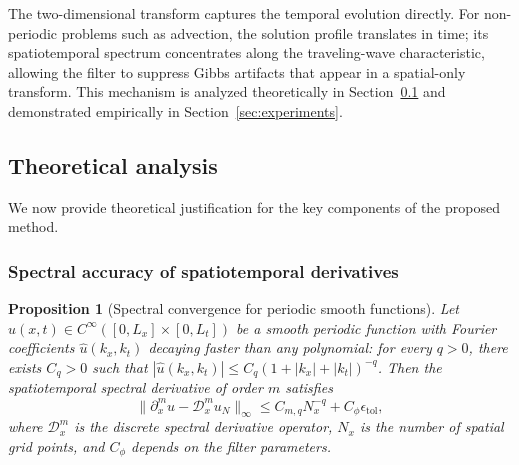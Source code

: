 \documentclass[preprint,12pt]{elsarticle}
\newtheorem{proposition}{Proposition}
\begin{document}
The two-dimensional transform captures the temporal evolution directly. For non-periodic problems such as advection, the solution profile translates in time; its spatiotemporal spectrum concentrates along the traveling-wave characteristic, allowing the filter to suppress Gibbs artifacts that appear in a spatial-only transform. This mechanism is analyzed theoretically in Section~\ref{sec:theory} and demonstrated empirically in Section~\ref{sec:experiments}.

\subsection{Theoretical analysis}
\label{sec:theory}

We now provide theoretical justification for the key components of the proposed method.

\subsubsection{Spectral accuracy of spatiotemporal derivatives}

\begin{proposition}[Spectral convergence for periodic smooth functions]
\label{prop:spectral}
Let $u(x,t) \in C^\infty([0,L_x]\times[0,L_t])$ be a smooth periodic function with Fourier coefficients $\hat{u}(k_x,k_t)$ decaying faster than any polynomial: for every $q>0$, there exists $C_q>0$ such that $|\hat{u}(k_x,k_t)| \le C_q (1+|k_x|+|k_t|)^{-q}$. Then the spatiotemporal spectral derivative of order $m$ satisfies
\begin{equation}
\|\partial_x^m u - \mathcal{D}_x^m u_N\|_\infty \le C_{m,q} N_x^{-q} + C_\phi \epsilon_{\mathrm{tol}},
\end{equation}
where $\mathcal{D}_x^m$ is the discrete spectral derivative operator, $N_x$ is the number of spatial grid points, and $C_\phi$ depends on the filter parameters.
\end{proposition}
\end{document}
